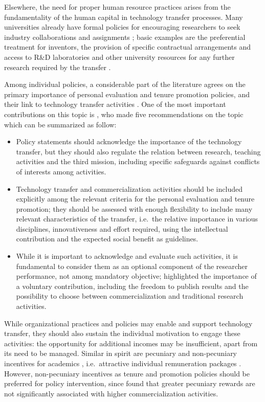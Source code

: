 Elsewhere, the need for proper human resource practices arises from the fundamentality of the human capital in technology transfer processes. Many universities already have formal policies for encouraging researchers to seek industry collaborations and assignments \citep{DEste2011}; basic examples are the preferential treatment for inventors, the provision of specific contractual arrangements and access to R\&D laboratories and other university resources for any further research required by the transfer \citep{Fini2009}.

Among individual policies, a considerable part of the literature agrees on the primary importance of personal evaluation and tenure promotion policies, and their link to technology transfer activities \citep{Debackere2005}. One of the most important contributions on this topic is \citet{Genshaft2016}, who made five recommendations on the topic which can be summarized as follow:
\begin{itemize}
\item Policy statements should acknowledge the importance of the technology transfer, but they should also regulate the relation between research, teaching activities and the third mission, including specific safeguards against conflicts of interests among activities.
\item Technology transfer and commercialization activities should be included explicitly among the relevant criteria for the personal evaluation and tenure promotion; they should be assessed with enough flexibility to include many relevant characteristics of the transfer, i.e.\ the relative importance in various disciplines, innovativeness and effort required, using the intellectual contribution and the expected social benefit as guidelines. 
\item While it is important to acknowledge and evaluate such activities, it is fundamental to consider them as an optional component of the researcher performance, not among mandatory objective; \citet{Rasmussen2006} highlighted the importance of a voluntary contribution, including the freedom to publish results and the possibility to choose between commercialization and traditional research activities. 
\end{itemize}

While organizational practices and policies may enable and support technology transfer, they should also sustain the individual motivation to engage these activities: the opportunity for additional incomes may be insufficient, apart from its need to be managed. Similar in spirit are pecuniary and non-pecuniary incentives for academics \citep{Link2007}, i.e.\ attractive individual remuneration packages \citep{Debackere2005}. However, non-pecuniary incentives as tenure and promotion policies should be preferred for policy intervention, since \citet{Friedman2003} found that greater pecuniary rewards are not significantly associated with higher commercialization activities.

